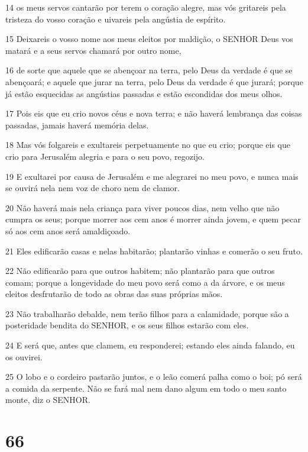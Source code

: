 \par 14 os meus servos cantarão por terem o coração alegre, mas vós gritareis pela tristeza do vosso coração e uivareis pela angústia de espírito.
\par 15 Deixareis o vosso nome aos meus eleitos por maldição, o SENHOR Deus vos matará e a seus servos chamará por outro nome,
\par 16 de sorte que aquele que se abençoar na terra, pelo Deus da verdade é que se abençoará; e aquele que jurar na terra, pelo Deus da verdade é que jurará; porque já estão esquecidas as angústias passadas e estão escondidas dos meus olhos.
\par 17 Pois eis que eu crio novos céus e nova terra; e não haverá lembrança das coisas passadas, jamais haverá memória delas.
\par 18 Mas vós folgareis e exultareis perpetuamente no que eu crio; porque eis que crio para Jerusalém alegria e para o seu povo, regozijo.
\par 19 E exultarei por causa de Jerusalém e me alegrarei no meu povo, e nunca mais se ouvirá nela nem voz de choro nem de clamor.
\par 20 Não haverá mais nela criança para viver poucos dias, nem velho que não cumpra os seus; porque morrer aos cem anos é morrer ainda jovem, e quem pecar só aos cem anos será amaldiçoado.
\par 21 Eles edificarão casas e nelas habitarão; plantarão vinhas e comerão o seu fruto.
\par 22 Não edificarão para que outros habitem; não plantarão para que outros comam; porque a longevidade do meu povo será como a da árvore, e os meus eleitos desfrutarão de todo as obras das suas próprias mãos.
\par 23 Não trabalharão debalde, nem terão filhos para a calamidade, porque são a posteridade bendita do SENHOR, e os seus filhos estarão com eles.
\par 24 E será que, antes que clamem, eu responderei; estando eles ainda falando, eu os ouvirei.
\par 25 O lobo e o cordeiro pastarão juntos, e o leão comerá palha como o boi; pó será a comida da serpente. Não se fará mal nem dano algum em todo o meu santo monte, diz o SENHOR.

\chapter{66}

